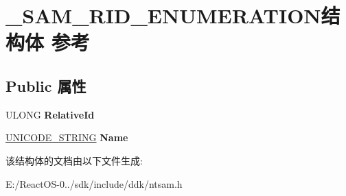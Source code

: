 \hypertarget{struct___s_a_m___r_i_d___e_n_u_m_e_r_a_t_i_o_n}{}\section{\+\_\+\+S\+A\+M\+\_\+\+R\+I\+D\+\_\+\+E\+N\+U\+M\+E\+R\+A\+T\+I\+O\+N结构体 参考}
\label{struct___s_a_m___r_i_d___e_n_u_m_e_r_a_t_i_o_n}
\subsection*{Public 属性}
\begin{DoxyCompactItemize}
\item 
\mbox{\label{struct___s_a_m___r_i_d___e_n_u_m_e_r_a_t_i_o_n_a12bd8c66bab28becc6a6a3e626c3191f}} 
U\+L\+O\+NG {\bfseries Relative\+Id}
\item 
\mbox{\label{struct___s_a_m___r_i_d___e_n_u_m_e_r_a_t_i_o_n_a055f34b1c501fa193762a05650fccb48}} 
\hyperlink{struct___u_n_i_c_o_d_e___s_t_r_i_n_g}{U\+N\+I\+C\+O\+D\+E\+\_\+\+S\+T\+R\+I\+NG} {\bfseries Name}
\end{DoxyCompactItemize}


该结构体的文档由以下文件生成\+:\begin{DoxyCompactItemize}
\item 
E\+:/\+React\+O\+S-\/0../sdk/include/ddk/ntsam.\+h\end{DoxyCompactItemize}
